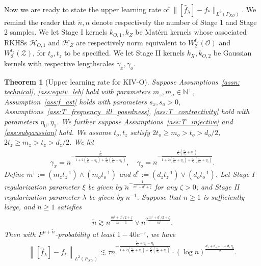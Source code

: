 \documentclass[11pt]{article}
\newcommand{\stageonesamples}{\tilde{n}}
\newcommand{\meffective}{m^{\dag}}
\newcommand{\deffective}{d^{\dag}}
\newcommand{\calZ}{\mathcal{Z}}
\newcommand{\calH}{\mathcal{H}}
\newcommand{\calO}{\mathcal{O}}
\newcommand{\0}{\mathbf{0}}
\newtheorem{thm}{Theorem}[section]
\begin{document}
Now we are ready to state the upper learning rate of $\|[\hat{f}_{\lambda}] - f_{\ast}\|_{L^2(P_{XO})}$. We remind the reader that $\tilde{n}, n$ denote respectively the number of Stage 1 and Stage 2 samples. We let Stage I kernels $k_{O, 1}, k_{Z}$ be Mat\'{e}rn kernels whose associated RKHSs $\calH_{O,1}$ and $\calH_Z$ are respectively norm equivalent to $W_2^{t_o}(\calO)$ and $W_2^{t_z}(\calZ)$, for $t_o, t_z$ to be specified. We let Stage II kernels $k_X, k
_{O,2}$ be Gaussian kernels with respective lengthscales $\gamma_x, \gamma_o$.  
\begin{thm}[Upper learning rate for KIV-O]\label{thm:upper_rate}
Suppose Assumptions~\ref{assn: technical}, \ref{ass:equiv_leb} hold with parameters $m_z, m_o \in \mathbb{N}^{+}$, Assumption~\ref{ass:f_ast} holds with parameters $s_x, s_o > 0$, Assumptions~\ref{ass:T_frequency_ill_posedness}, \ref{ass:T_contractivity} hold with parameters $\eta_0, \eta_1$. We further suppose Assumptions~\ref{ass:T_injective} and \ref{ass:subgaussian} hold. We assume $t_o, t_z$ satisfy $2t_o \geq m_o > t_o > d_o/2$, $2 t_z \geq m_z > t_z > d_z/2$. We let
\begin{align}\label{eq:lengthscale_main}
    \gamma_x = n^{-\frac{\frac{1}{d_x}}{1+2(\frac{s_x}{d_x}+\eta_1)+\frac{d_o}{s_o}(\frac{s_x}{d_x}+\eta_1)}}, \quad \gamma_o = n^{-\frac{\frac{1}{s_o}(\frac{s_x}{d_x}+\eta_1)}{1+2(\frac{s_x}{d_x}+\eta_1)+\frac{d_o}{s_o}(\frac{s_x}{d_x}+\eta_1)}}. 
\end{align}  Define $\meffective := (m_z t_z^{-1}) \wedge (m_o t_o^{-1})$ and $\deffective := (d_z t_z^{-1}) \vee (d_o t_o^{-1})$. 
Let Stage I regularization parameter $\xi$ be given by $\stageonesamples^{-\frac{1}{\meffective + \deffective + \zeta}}$ for any $\zeta>0$; and Stage II regularization parameter $\lambda$ be given by $n^{-1}$. Suppose that $n\geq 1$ is sufficiently large, and $\stageonesamples \geq 1$ satisfies
\begin{align}\label{eq:m_sufficient_large}
\begin{aligned}
    \stageonesamples \gtrsim n^{\frac{\meffective + \deffective/2 + \zeta}{\meffective-1}} \vee n^{2 \frac{\meffective + \deffective/2 + \zeta}{\meffective}}.
\end{aligned}
\end{align}
Then with $P^{n+\stageonesamples}$-probability at least $1-  40e^{-\tau}$, we have
\begin{align}
\label{eq:upper_rate}
    \left\|\left[\hat{f}_{\lambda}\right] - f_{\ast}\right\|_{L^2(P_{XO})} \lesssim \tau n^{-\frac{\frac{s_x}{d_x}+\eta_1-\eta_0}{1+2(\frac{s_x}{d_x}+\eta_1)+\frac{d_o}{s_o}(\frac{s_x}{d_x}+\eta_1)}} \cdot (\log n)^{\frac{d_x+d_o+1+d_x\eta_0}{2}} .
\end{align}
\end{thm}
\end{document}
